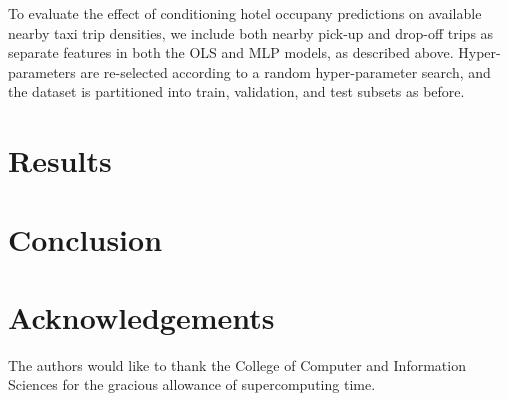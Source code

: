 \documentclass[useAMS, referee, usenatbib]{biom}
\begin{document}
To evaluate the effect of conditioning hotel occupany predictions on available nearby taxi trip densities, we include both nearby pick-up and drop-off trips as separate features in both the OLS and MLP models, as described above. Hyper-parameters are re-selected according to a random hyper-parameter search, and the dataset is partitioned into train, validation, and test subsets as before. 

\section{Results}
\label{s:results}

\section{Conclusion}
\label{s:conclusion}

\backmatter

\section*{Acknowledgements}

The authors would like to thank the College of Computer and Information Sciences for the gracious allowance of supercomputing time.

 


\label{lastpage}
\end{document}
